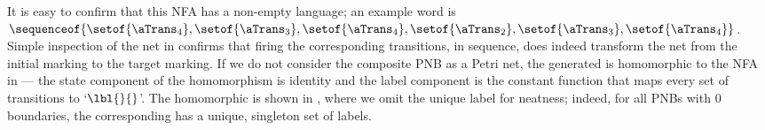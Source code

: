 It is easy to confirm that this NFA has a non-empty language; an example word
is
$\sequenceof{\setof{\aTrans_4},\setof{\aTrans_3},\setof{\aTrans_4},\setof{\aTrans_2},\setof{\aTrans_3},\setof{\aTrans_4}}$.
Simple inspection of the net in  confirms that firing
the corresponding transitions, in sequence, does indeed transform the net from
the initial marking to the target marking. If we do not consider the composite
PNB as a Petri net, the generated \TNFA{} is homomorphic to the NFA in
 --- the state component of the homomorphism is
identity and the label component is the constant function that maps every set
of transitions to `$\lbl{}{}$'. The homomorphic \TNFA{} is shown in
, where we omit the unique label for
neatness; indeed, for all PNBs with 0 boundaries, the corresponding \TNFA{} has
a unique, singleton set of labels.

